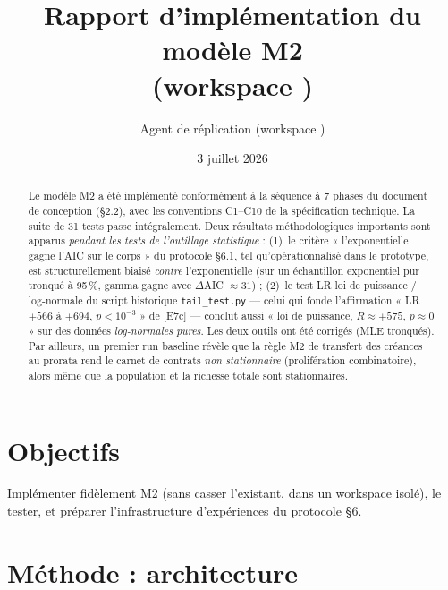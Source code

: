\documentclass[11pt,a4paper]{article}
\title{Rapport d'implémentation du modèle M2\\
\large (workspace \code{m2\_fable})}
\author{Agent de réplication (workspace \code{m2\_fable})}
\date{3 juillet 2026}
\newcommand{\code}[1]{\texttt{#1}}
\begin{document}
\maketitle

\begin{abstract}
Le modèle M2 a été implémenté conformément à la séquence à 7 phases du
document de conception (§2.2), avec les conventions C1--C10 de la
spécification technique. La suite de 31 tests passe intégralement. Deux
résultats méthodologiques importants sont apparus \emph{pendant les tests de
l'outillage statistique} : (1)~le critère « l'exponentielle gagne l'AIC sur
le corps » du protocole §6.1, tel qu'opérationnalisé dans le prototype, est
structurellement biaisé \emph{contre} l'exponentielle (sur un échantillon
exponentiel pur tronqué à 95\,\%, gamma gagne avec $\Delta$AIC $\approx 31$) ;
(2)~le test LR loi de puissance / log-normale du script historique
\code{tail\_test.py} — celui qui fonde l'affirmation « LR $+566$ à $+694$,
$p<10^{-3}$ » de [E7c] — conclut aussi « loi de puissance, $R \approx +575$,
$p \approx 0$ » sur des données \emph{log-normales pures}. Les deux outils ont
été corrigés (MLE tronqués). Par ailleurs, un premier run baseline révèle que
la règle M2 de transfert des créances au prorata rend le carnet de contrats
\emph{non stationnaire} (prolifération combinatoire), alors même que la
population et la richesse totale sont stationnaires.
\end{abstract}

\section{Objectifs}
Implémenter fidèlement M2 (sans casser l'existant, dans un workspace isolé),
le tester, et préparer l'infrastructure d'expériences du protocole §6.

\section{Méthode : architecture}
\end{document}
